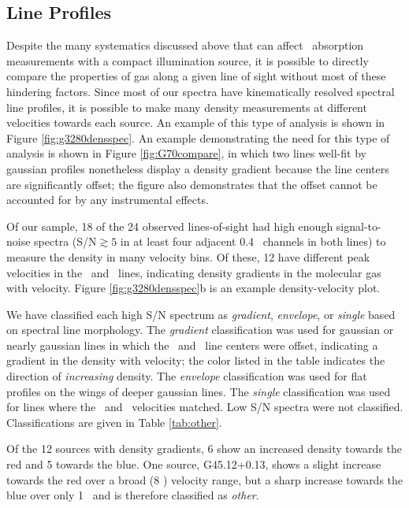 \subsection{Line Profiles}
\label{sec:lineprofiles}
Despite the many systematics discussed above that can affect \formaldehyde\
absorption measurements with a compact illumination source, it is possible to
directly compare the properties of gas along a given line of sight without most
of these hindering factors.  Since most of our spectra have kinematically
resolved spectral line profiles, it is possible to make many density measurements at
different velocities towards each source.  An example of this type of analysis
is shown in Figure \ref{fig:g3280densspec}.  An example demonstrating the need for
this type of analysis is shown in Figure \ref{fig:G70compare}, in which two lines
well-fit by gaussian profiles nonetheless display a density gradient because the
line centers are significantly offset; the figure also demonstrates that the offset
cannot be accounted for by any instrumental effects.

Of our sample, 18 of the 24 observed lines-of-sight had high enough signal-to-noise spectra 
(S/N$\gtrsim5$ in at least four adjacent 0.4 \kms\ channels in both lines) to
measure the density in many velocity bins.  Of these, 12 have different peak
velocities in the \oneone\ and \twotwo\ lines, indicating density gradients in
the molecular gas with velocity.  Figure \ref{fig:g3280densspec}b is an example
density-velocity plot.%

We have classified each high S/N spectrum as {\it gradient}, {\it envelope}, or
{\it single} based on spectral line morphology.  The {\it gradient} classification was used
for gaussian or nearly gaussian lines in which the \oneone\ and \twotwo\ line
centers were offset, indicating a gradient in the density with velocity; the
color listed in the table indicates the direction of \emph{increasing} density.  The {\it
envelope} classification was used for flat profiles on the wings of deeper
gaussian lines.  The {\it single} classification was used for lines where the
\oneone\ and \twotwo\ velocities matched.  Low S/N spectra were not classified.
Classifications are given in Table \ref{tab:other}.

Of the 12 sources with density gradients, 6 show an increased density towards
the red and 5 towards the blue.  One source, G45.12+0.13, shows a slight
increase towards the red over a broad (8 \kms) velocity range, but a sharp
increase towards the blue over only 1 \kms\ and is therefore classified as {\it
other}.

